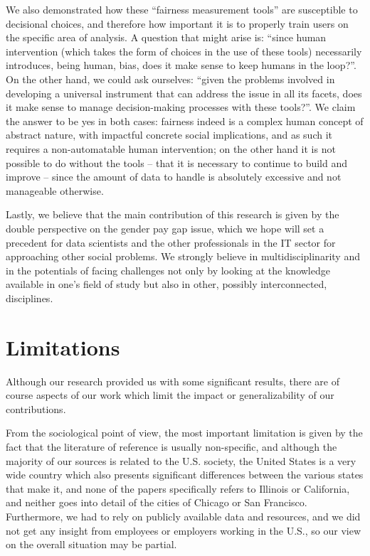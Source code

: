 We also demonstrated how these ``fairness measurement tools'' are susceptible to decisional choices, and therefore how important it is to properly train users on the specific area of analysis. A question that might arise is: ``since human intervention (which takes the form of choices in the use of these tools) necessarily introduces, being human, bias, does it make sense to keep humans in the loop?''. On the other hand, we could ask ourselves: ``given the problems involved in developing a universal instrument that can address the issue in all its facets, does it make sense to manage decision-making processes with these tools?''. We claim the answer to be yes in both cases: fairness indeed is a complex human concept of abstract nature, with impactful concrete social implications, and as such it requires a non-automatable human intervention; on the other hand it is not possible to do without the tools -- that it is necessary to continue to build and improve -- since the amount of data to handle is absolutely excessive and not manageable otherwise.

Lastly, we believe that the main contribution of this research is given by the double perspective on the gender pay gap issue, which we hope will set a precedent for data scientists and the other professionals in the IT sector for approaching other social problems. We strongly believe in multidisciplinarity and in the potentials of facing challenges not only by looking at the knowledge available in one's field of study but also in other, possibly interconnected, disciplines.


\section{Limitations}
\label{section:limitations}
Although our research provided us with some significant results, there are of course aspects of our work which limit the impact or generalizability of our contributions.

From the sociological point of view, the most important limitation is given by the fact that the literature of reference is usually non-specific, and although the majority of our sources is related to the U.S. society, the United States is a very wide country which also presents significant differences between the various states that make it, and none of the papers specifically refers to Illinois or California, and neither goes into detail of the cities of Chicago or San Francisco. Furthermore, we had to rely on publicly available data and resources, and we did not get any insight from employees or employers working in the U.S., so our view on the overall situation may be partial.

